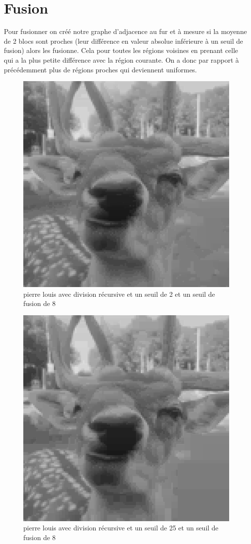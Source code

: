 \documentclass{article}
\begin{document}
\section{Fusion}
Pour fusionner on créé notre graphe d'adjacence au fur et à mesure si la moyenne de 2 blocs sont proches (leur différence en valeur absolue inférieure à un seuil de fusion) alors les fusionne.
Cela pour toutes les régions voisines en prenant celle qui a la plus petite différence avec la région courante.
On a donc par rapport à précédemment plus de régions proches qui deviennent uniformes.
\begin{figure}[h]
\centerline{\includegraphics[scale=0.5]{./pierrelouisdiviserecursiveseuil2Fusion.png}}
\caption{pierre louis avec division récursive et un seuil de 2 et un seuil de fusion de 8}
\end{figure}

\begin{figure}[h]
\centerline{\includegraphics[scale=0.5]{./pierrelouisdiviserecursiveseuil25Fusion.png}}
\caption{pierre louis avec division récursive et un seuil de 25 et un seuil de fusion de 8}
\end{figure}
\end{document}

